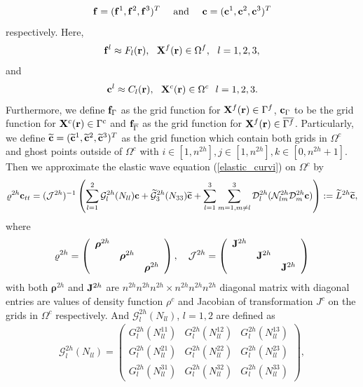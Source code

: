 \[{\bf f} = ({\bf f}^1, {\bf f}^2, {\bf f}^3)^T\ \ \ \ \mbox{and}\ \ \ \  {\bf c} = ({\bf c}^1, {\bf c}^2, {\bf c}^3)^T\]
respectively. Here, 
\[{\bf f}^l\approx F_l({\bf r}), \ \ {\bf X}^f({\bf r})\in\Omega^f,\ \ l=1,2,3 ,\]
and
\[{\bf c}^l \approx C_l({\bf r}),\ \ {\bf X}^c({\bf r})\in\Omega^c \ \ l = 1,2,3.\]
Furthermore, we define ${\bf f}_{\Gamma}$ as the grid function for ${\bf X}^f({{\bf r}})\in\Gamma^f$, ${\bf c}_{\Gamma}$ to be the grid function for ${\bf X}^c({{\bf r}})\in\Gamma^c$ and ${\bf f}_{\overline{\Gamma}}$ as the grid function for ${\bf X}^f({{\bf r}})\in\overline{\Gamma^f}$. Particularly, we define $\widetilde{\bf c} = (\widetilde{\bf c}^1,\widetilde{\bf c}^2,\widetilde{\bf c}^3)^T$ as the grid function which contain both grids in $\Omega^c$ and ghost points outside of $\Omega^c$ with $i\in[1,n^{2h}], j\in[1,n^{2h}], k\in[0,n^{2h}+1]$. Then we approximate the elastic wave equation (\ref{elastic_curvi}) on $\Omega^c$ by
\begin{equation}\label{elastic_semi_c}
{\varrho}^{2h} {\bf c}_{tt} =( \mathcal{ J}^{2h})^{-1}\left(\sum_{l=1}^2\mathcal{G}_l^{2h}({N}_{ll}){\bf c}+\wt{\mathcal{G}}_3^{2h}({N}_{33}){\wt{\bf c}}+\sum_{l=1}^3\sum_{m=1,m\neq l}^3\mathcal{D}_l^{2h}(\mathcal{N}_{lm}^{2h}\mathcal{D}_m^{2h}{\bf c})\right) := \wt{L}^{2h} {\wt {\bf c}},
\end{equation}
where 
\begin{align}\label{rho_j}
\varrho^{2h} = \left(\begin{array}{ccc}
{\bm \rho}^{2h}& ~  & ~ \\
~ & {\bm \rho}^{2h} & ~ \\
~ &~  &{\bm \rho}^{2h}\end{array}\right),\ \ \ \mathcal{J}^{2h} = \left(\begin{array}{ccc}
{\bf J}^{2h}& ~  & ~ \\
~ & {\bf J}^{2h} & ~ \\
~ &~  &{\bf J}^{2h}\end{array}\right)
\end{align}
with both ${\bm \rho}^{2h}$ and ${\bf J}^{2h}$ are $n^{2h}n^{2h}n^{2h}\times n^{2h}n^{2h}n^{2h}$ diagonal matrix with diagonal entries are values of density function $\rho^c$ and Jacobian of transformation $J^c$ on the grids in $\Omega^c$ respectively.
And $\mathcal{G}_l^{2h}({N}_{ll})$, $l=1,2$ are defined as
\begin{align}\label{g1122}
\mathcal{G}^{2h}_l({N}_{ll}) = \left(\begin{array}{ccc}
G_l^{2h}(N_{ll}^{11}) & G_l^{2h}(N_{ll}^{12})  & G_l^{2h}(N_{ll}^{13}) \\
G_l^{2h}(N_{ll}^{21}) & G_l^{2h}(N_{ll}^{22})  & G_l^{2h}(N_{ll}^{23}) \\
G_l^{2h}(N_{ll}^{31}) & G_l^{2h}(N_{ll}^{32})  & G_l^{2h}(N_{ll}^{33}) \end{array}\right),
\end{align}
